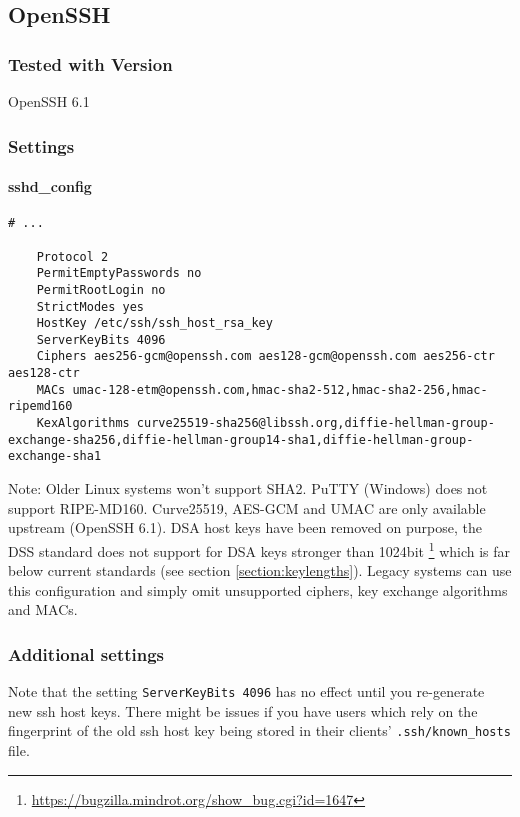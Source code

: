 \subsection{OpenSSH}
\subsubsection{Tested with Version} OpenSSH 6.1
\subsubsection{Settings}
\paragraph*{sshd_config}
\begin{lstlisting}[breaklines]
	# ...

	Protocol 2
	PermitEmptyPasswords no
	PermitRootLogin no
	StrictModes yes
	HostKey /etc/ssh/ssh_host_rsa_key
	ServerKeyBits 4096
	Ciphers aes256-gcm@openssh.com aes128-gcm@openssh.com aes256-ctr aes128-ctr
	MACs umac-128-etm@openssh.com,hmac-sha2-512,hmac-sha2-256,hmac-ripemd160
	KexAlgorithms curve25519-sha256@libssh.org,diffie-hellman-group-exchange-sha256,diffie-hellman-group14-sha1,diffie-hellman-group-exchange-sha1
\end{lstlisting}

Note: Older Linux systems won't support SHA2. PuTTY (Windows) does not support
RIPE-MD160. Curve25519, AES-GCM and UMAC are only available upstream (OpenSSH
6.1). DSA host keys have been removed on purpose, the DSS standard does not
support for DSA keys stronger than 1024bit
\footnote{\url{https://bugzilla.mindrot.org/show_bug.cgi?id=1647}} which is far
below current standards (see section \ref{section:keylengths}). Legacy systems
can use this configuration and simply omit unsupported ciphers, key exchange
algorithms and MACs.  
\subsubsection{Additional settings}
Note that the setting \texttt{ServerKeyBits 4096}  has no effect until you re-generate new ssh host keys. There might be issues if you have users which rely on the fingerprint of the old ssh host key being stored in their clients' \texttt{.ssh/known\_hosts} file.
